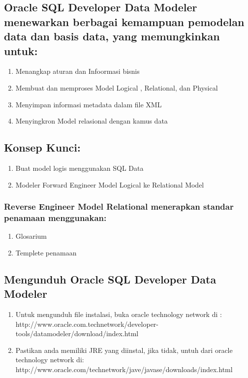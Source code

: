 \documentclass{article}
\begin{document}
\begin{enumerate}
\subsection{Oracle SQL Developer Data Modeler menewarkan berbagai kemampuan pemodelan data dan basis data, yang memungkinkan untuk:}
\begin{enumerate}
    \item Menangkap  aturan dan Infoormasi bisnis
    \item Membuat dan memproses Model Logical , Relational, dan Physical
    \item Menyimpan informasi metadata dalam file XML
    \item Menyingkron Model relasional dengan kamus data
\end{enumerate}
\subsection{Konsep Kunci:}
\begin{enumerate}
    \item Buat model logis menggunakan SQL Data 
    \item Modeler Forward Engineer Model Logical ke Relational Model
\end{enumerate}
\subsubsection{Reverse Engineer Model Relational menerapkan standar penamaan menggunakan:}
\begin{enumerate}
    \item Glosarium
    \item Templete penamaan 
\end{enumerate}
\subsection{Mengunduh Oracle SQL Developer Data Modeler}
 \begin{enumerate}
       \item Untuk mengunduh file instalasi, buka oracle technology network di :
http://www.oracle.com.technetwork/developer-tools/datamodeler/download/index.html
        \item Pastikan anda memiliki JRE yang diinstal, jika tidak, untuh dari oracle technology network di:
http://www.oracle.com/technetwork/jave/javase/downloads/index.html
   \end{enumerate}

\end{enumerate}
\end{document}
